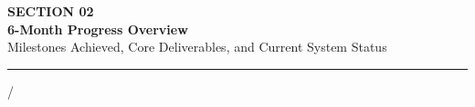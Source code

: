 \documentclass[aspectratio=169,10pt]{beamer}
\begin{document}
\begin{frame}[plain]
\vspace*{1.3cm}
\begin{center}
  {\fontsize{9.5pt}{12pt}\selectfont\bfseries\color{SubText} SECTION 02}\\[0.35cm]
  {\fontsize{24pt}{28pt}\selectfont\bfseries\color{DarkText} 6-Month Progress Overview}\\[0.35cm]
  {\fontsize{11pt}{15pt}\selectfont\color{SubText} Milestones Achieved, Core Deliverables, and Current System Status}\\[0.45cm]
  {\color{black}\rule{3.5cm}{1.5pt}}
\end{center}
\vfill
\begin{flushright}
  {\fontsize{8pt}{10pt}\selectfont\color{DarkText} \insertframenumber/\inserttotalframenumber\hspace*{0.8cm}}
\end{flushright}
\vspace*{0.15cm}
\end{frame}
\end{document}
